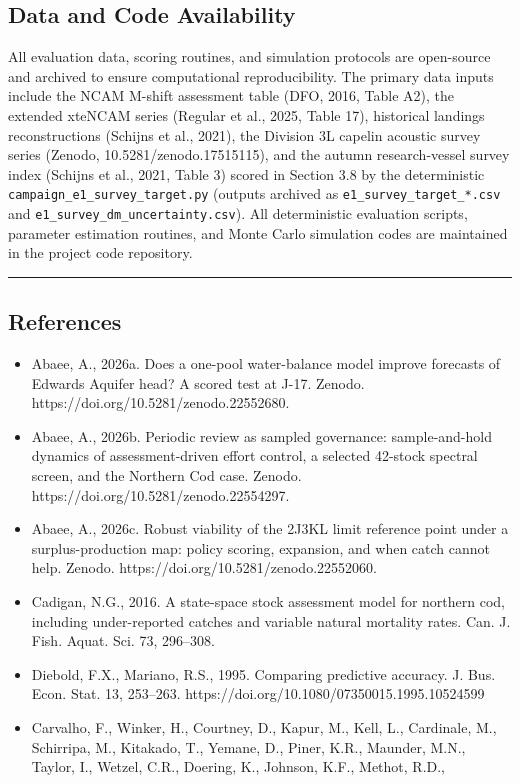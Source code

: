 \documentclass[11pt]{article}
\begin{document}
\subsection{Data and Code
Availability}\label{data-and-code-availability}

All evaluation data, scoring routines, and simulation protocols are
open-source and archived to ensure computational reproducibility. The
primary data inputs include the NCAM M-shift assessment table (DFO,
2016, Table A2), the extended xteNCAM series (Regular et al., 2025,
Table 17), historical landings reconstructions (Schijns et al., 2021),
the Division 3L capelin acoustic survey series (Zenodo,
10.5281/zenodo.17515115), and the autumn research-vessel survey index
(Schijns et al., 2021, Table 3) scored in Section 3.8 by the
deterministic \texttt{campaign\_e1\_survey\_target.py} (outputs archived
as \texttt{e1\_survey\_target\_*.csv} and
\texttt{e1\_survey\_dm\_uncertainty.csv}). All deterministic evaluation
scripts, parameter estimation routines, and Monte Carlo simulation codes
are maintained in the project code repository.

\begin{center}\rule{0.5\linewidth}{0.5pt}\end{center}

\subsection{References}\label{references}

\begin{itemize}
\item
  Abaee, A., 2026a. Does a one-pool water-balance model improve
  forecasts of Edwards Aquifer head? A scored test at J-17. Zenodo.
  https://doi.org/10.5281/zenodo.22552680.
\item
  Abaee, A., 2026b. Periodic review as sampled governance:
  sample-and-hold dynamics of assessment-driven effort control, a
  selected 42-stock spectral screen, and the Northern Cod case. Zenodo.
  https://doi.org/10.5281/zenodo.22554297.
\item
  Abaee, A., 2026c. Robust viability of the 2J3KL limit reference point
  under a surplus-production map: policy scoring, expansion, and when
  catch cannot help. Zenodo. https://doi.org/10.5281/zenodo.22552060.
\item
  Cadigan, N.G., 2016. A state-space stock assessment model for northern
  cod, including under-reported catches and variable natural mortality
  rates. Can. J. Fish. Aquat. Sci. 73, 296--308.
\item
  Diebold, F.X., Mariano, R.S., 1995. Comparing predictive accuracy. J.
  Bus. Econ. Stat. 13, 253--263.
  https://doi.org/10.1080/07350015.1995.10524599
\item
  Carvalho, F., Winker, H., Courtney, D., Kapur, M., Kell, L.,
  Cardinale, M., Schirripa, M., Kitakado, T., Yemane, D., Piner, K.R.,
  Maunder, M.N., Taylor, I., Wetzel, C.R., Doering, K., Johnson, K.F.,
  Methot, R.D.,
\end{itemize}
\end{document}
